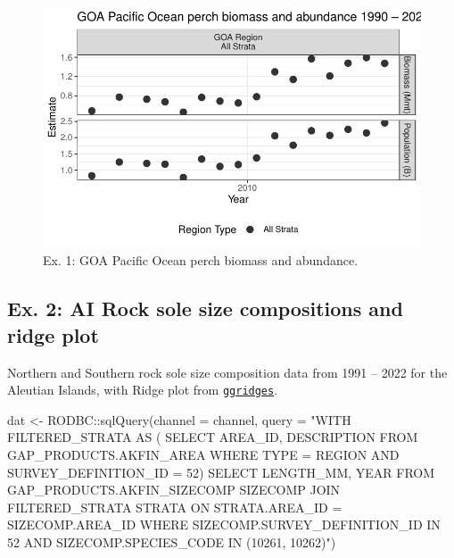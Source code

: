 \documentclass[
  letterpaper,
  oneside,
  open=any]{scrbook}
\newenvironment{Shaded}{\begin{snugshade}}{\end{snugshade}}
\newcommand{\AttributeTok}[1]{\textcolor[rgb]{0.40,0.45,0.13}{#1}}
\newcommand{\FunctionTok}[1]{\textcolor[rgb]{0.28,0.35,0.67}{#1}}
\newcommand{\NormalTok}[1]{\textcolor[rgb]{0.00,0.23,0.31}{#1}}
\newcommand{\OtherTok}[1]{\textcolor[rgb]{0.00,0.23,0.31}{#1}}
\newcommand{\SpecialCharTok}[1]{\textcolor[rgb]{0.37,0.37,0.37}{#1}}
\newcommand{\StringTok}[1]{\textcolor[rgb]{0.13,0.47,0.30}{#1}}
\begin{document}
\begin{figure}[H]

{\centering \includegraphics{content/akfin-oracle-sql-r_files/figure-pdf/test-1-plot-1.pdf}

}

\caption{Ex. 1: GOA Pacific Ocean perch biomass and abundance.}

\end{figure}

\hypertarget{ex.-2-ai-rock-sole-size-compositions-and-ridge-plot}{%
\subsection{Ex. 2: AI Rock sole size compositions and ridge
plot}\label{ex.-2-ai-rock-sole-size-compositions-and-ridge-plot}}

Northern and Southern rock sole size composition data from 1991 -- 2022
for the Aleutian Islands, with Ridge plot from
\href{https://cran.r-project.org/web/packages/ggridges/vignettes/introduction.html}{\texttt{ggridges}}.

\begin{Shaded}
\begin{Highlighting}[]
\NormalTok{dat }\OtherTok{\textless{}{-}}\NormalTok{ RODBC}\SpecialCharTok{::}\FunctionTok{sqlQuery}\NormalTok{(}\AttributeTok{channel =}\NormalTok{ channel, }
                       \AttributeTok{query =} 
\StringTok{"WITH FILTERED\_STRATA AS (}
\StringTok{SELECT }
\StringTok{AREA\_ID, }
\StringTok{DESCRIPTION }
\StringTok{FROM GAP\_PRODUCTS.AKFIN\_AREA}
\StringTok{WHERE TYPE = \textquotesingle{}REGION\textquotesingle{} }
\StringTok{AND SURVEY\_DEFINITION\_ID = 52)}
\StringTok{SELECT }
\StringTok{LENGTH\_MM, }
\StringTok{YEAR}
\StringTok{FROM GAP\_PRODUCTS.AKFIN\_SIZECOMP SIZECOMP}
\StringTok{JOIN FILTERED\_STRATA STRATA }
\StringTok{ON STRATA.AREA\_ID = SIZECOMP.AREA\_ID}
\StringTok{WHERE SIZECOMP.SURVEY\_DEFINITION\_ID IN 52 }
\StringTok{AND SIZECOMP.SPECIES\_CODE IN (10261, 10262)"}\NormalTok{)}
\end{Highlighting}
\end{Shaded}
\end{document}
